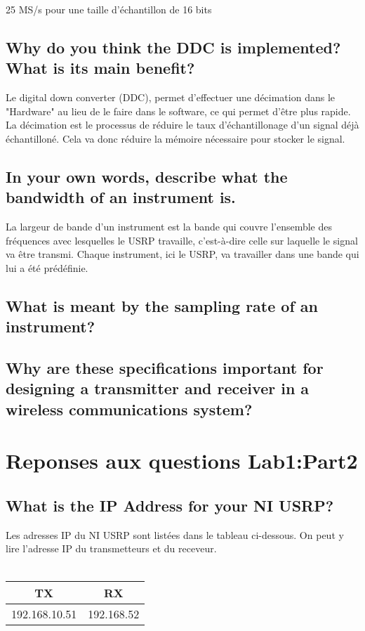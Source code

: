 \documentclass[11pt]{article}
\begin{document}
25 MS/s pour une taille d'échantillon de 16 bits

\subsection{Why do you think the DDC is implemented? What is its main benefit?}

Le digital down converter (DDC), permet d'effectuer une décimation dans le "Hardware" au lieu de le faire dans le software, ce qui permet d'être plus rapide. La décimation est le processus de réduire le taux d'échantillonage d'un signal déjà échantilloné. Cela va donc réduire la mémoire nécessaire pour stocker le signal.

\subsection{In your own words, describe what the bandwidth of an instrument is.}

La largeur de bande d'un instrument est la bande qui couvre l'ensemble des fréquences avec lesquelles le USRP travaille, c'est-à-dire celle sur laquelle le signal va être transmi. Chaque instrument, ici le USRP, va travailler dans une bande qui lui a été prédéfinie.

\subsection{What is meant by the sampling rate of an instrument?}

\subsection{Why are these specifications important for designing a transmitter and
receiver in a wireless communications system?}

\section{Reponses aux questions Lab1:Part2}

\subsection{What is the IP Address for your NI USRP?}
Les adresses IP du NI USRP  sont listées dans le tableau ci-dessous. On peut y lire l'adresse IP du transmetteurs et du receveur. \\ \\
 \begin{tabular}{|c|c|}
      \hline
      TX & RX  \\
      \hline
      192.168.10.51 & 192.168.52 \\
      \hline
 \end{tabular}
\end{document}
